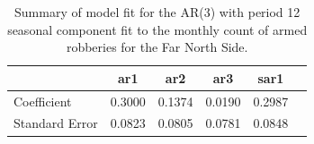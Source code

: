 \documentclass{article} %
\begin{document}
 
\begin{table}[h]
	\label{tab:data}
	\begin{center}
	\begin{tabular}{lccccc}
			\hline
			&           ar1  &   ar2  & ar3 &   sar1    \\\hline
Coefficient   &    0.3000 & 0.1374 & 0.0190 & 0.2987  \\
Standard Error &  0.0823 & 0.0805 & 0.0781 & 0.0848  \\ 
		\end{tabular}
	\caption{Summary of model fit for the AR(3) with period 12 seasonal component fit to the monthly count of armed robberies for the Far North Side.}
	\end{center}
\end{table}

 \break
 \newpage
 
 
 
 
\end{document}

